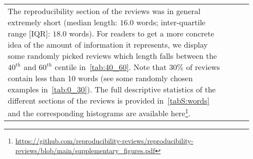 \begin{tabular}{llll}
\hline
The reproducibility section of the reviews was in general extremely short (median length: $16.0$ words; inter-quartile range [IQR]: $18.0$ words).
For readers to get a more concrete idea of the amount of information it represents, we display some randomly picked reviews which length falls between the $40^{th}$ and $60^{th}$ centile in~\autoref{tab:40_60}.
Note that $30\%$ of reviews contain less than 10 words (see some randomly chosen examples in~\autoref{tab:0_30}).
The full descriptive statistics of the different sections of the reviews is provided in~\autoref{tabS:words} and the corresponding histograms are available here\footnote{\url{https://github.com/reproducibility-reviews/reproducibility-reviews/blob/main/supplementary_figures.pdf}}.
\hline
\end{tabular}
